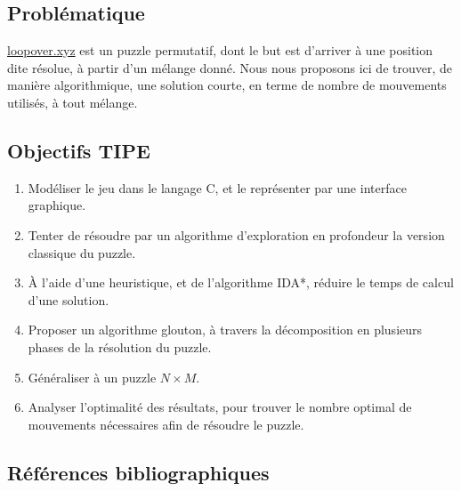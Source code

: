 \documentclass[a4paper, 12pt]{article}
\newcommand{\hreftwo}[1]{\href{#1}{#1}}
\begin{document}
	\subsection*{Problématique}
	\hreftwo{loopover.xyz} est un puzzle permutatif, dont le but est d'arriver à une position dite résolue, à partir d'un mélange donné. Nous nous proposons ici de trouver, de manière algorithmique, une solution courte, en terme de nombre de mouvements utilisés, à tout mélange.
	
	\subsection*{Objectifs TIPE}
	\begin{enumerate}
		\item Modéliser le jeu dans le langage C, et le représenter par une interface graphique.
		\item Tenter de résoudre par un algorithme d'exploration en profondeur la version classique du puzzle.
		\item À l'aide d'une heuristique, et de l'algorithme IDA*, réduire le temps de calcul d'une solution.
		\item Proposer un algorithme glouton, à travers la décomposition en plusieurs phases de la résolution du puzzle.
		\item Généraliser à un puzzle $N \times M$.
		\item Analyser l'optimalité des résultats, pour trouver le nombre optimal de mouvements nécessaires afin de résoudre le puzzle.
	\end{enumerate}
	
	 \newpage
	\subsection*{Références bibliographiques}
	\theendnotes
\end{document}
